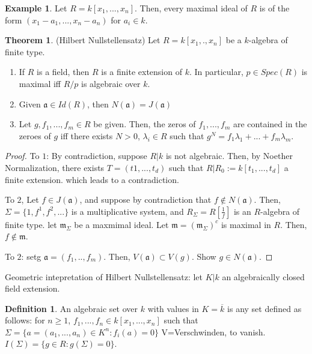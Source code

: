 \documentclass{article}
\theoremstyle{definition}
\newtheorem{theorem}{Theorem}[section]
\theoremstyle{definition}
\theoremstyle{definition}
\theoremstyle{definition}
\theoremstyle{definition}
\newtheorem{definition}{Definition}[section]
\theoremstyle{definition}
\theoremstyle{definition}
\newtheorem{example}{Example}[section]
\begin{document}
\begin{tcolorbox}[colback=yellow!5!white,colframe=yellow!30!white]
\begin{example}
Let $R=k[x_1,...,x_n]$. Then, every maximal ideal of $R$ is of the form $(x_1-a_1,...,x_n-a_n)$ for $a_i\in k$. 
\end{example}
\end{tcolorbox}


\begin{tcolorbox}[colback=red!5!white,colframe=red!30!white]
\begin{theorem}
(Hilbert Nullstellensatz) Let $R=k[x_1,.,x_n]$ be a $k$-algebra of finite type. 
\begin{enumerate}
    \item If $R$ is a field, then $R$ is a finite extension of $k$. In particular, $p\in Spec(R)$ is maximal iff $R/p$ is algebraic over $k$. 
    \item Given $\mathfrak{a}\in Id(R)$, then $N(\mathfrak{a})=J(\mathfrak{a})$
    \item Let $g, f_1,...,f_m\in R$ be given. Then, the zeros of $f_1,...,f_m$ are contained in the zeroes of $g$ iff there exists $N>0$, $\lambda_i\in R$ such that $g^N=f_1\lambda_1+...+f_m\lambda_m$. 
\end{enumerate}
\end{theorem}
\end{tcolorbox}
\begin{proof}
    To $1$: By contradiction, suppose $R|k$ is not algebraic. Then, by Noether Normalization, there exists $T=(t1,...,t_d)$ such that $R|R_0:=k[t_1,...,t_d]$ a finite extension. which leads to a contradiction. 

    To $2$, Let $f\in J(\mathfrak{a})$, and suppose by contradiction that $f\not\in N(\mathfrak{a})$. Then, $\Sigma=\{1,f^1,f^2,...\}$ is a multiplicative system, and $R_{\Sigma}=R[\frac{1}{f}]$ is an $R$-algebra of finite type. let $\mathfrak{m}_{\Sigma}$ be a maxmimal ideal. Let $\mathfrak{m}=(\mathfrak{m}_{\Sigma})^{c}$ is maximal in $R$. Then, $f\not \in \mathfrak{m}$. 

    To $2$: setg $\mathfrak{a}=(f_1,..,f_m)$. Then, $V(\mathfrak{a})\subset V(g)$. Show $g\in N(\mathfrak{a})$. 
\end{proof}

Geometric intepretation of Hilbert Nullstellensatz: let $K|k$ an algebraically closed field extension. 


\begin{tcolorbox}[colback=purple!5!white,colframe=purple!75!black]
\begin{definition}
An algebraic set over $k$ with values in $K=\overline{k}$ is any set defined as follows: for $n\geq 1$, $f_1,...,f_n\in k[x_1,...,x_n]$ such that $\Sigma=\{ a=(a_1,...,a_n)\in K^n: f_i(a)=0 \}$ V=Verschwinden, to vanish. $I(\Sigma)=\{ g\in R: g(\Sigma)=0 \}$. 
\end{definition}
\end{tcolorbox}
\end{document}
